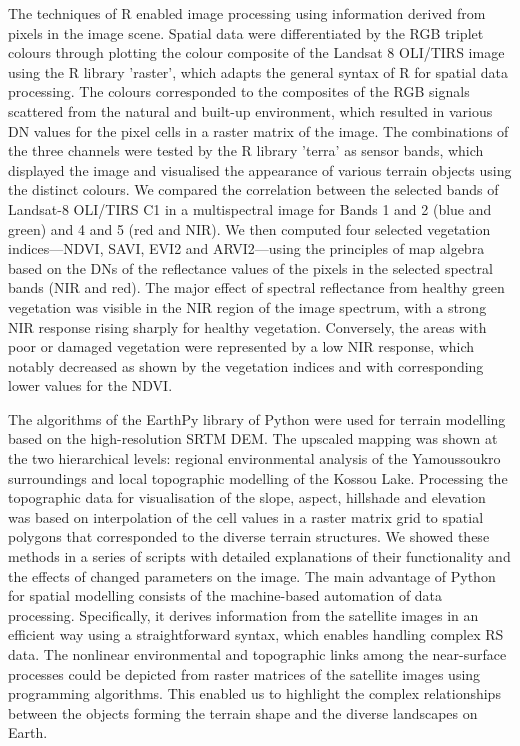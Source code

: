 \documentclass[jimaging,article,accept,pdftex,moreauthors]{Definitions/mdpi}
\begin{document}
The techniques of R {enabled} image processing{ }using information derived from pixels in the image scene. {Spatial data} were differentiated by the RGB triplet colours through plotting the colour composite of the Landsat 8 OLI/TIRS image using the R library 'raster', which {adapts} the general syntax of R for spatial data processing. The colours corresponded to the composites of the RGB signals scattered from the natural and built-up environment, which resulted in various DN values for the pixel cells in a raster matrix {of the image}. The combinations of the three channels were tested by the R library 'terra' as sensor bands, which {displayed} the image and {visualised} the appearance of various {terrain }objects{ }using the distinct colours. We compared the correlation between the selected bands of Landsat-8 OLI/TIRS C1 in a multispectral image for {Bands} 1 and 2 (blue and green) and 4 and 5 (red and NIR). We then computed four selected vegetation indices---NDVI, SAVI, EVI2 and ARVI2---using the principles of map algebra based on the DNs of the reflectance values of the pixels in the selected spectral bands (NIR and red). The major effect of spectral reflectance from healthy green vegetation was visible in the NIR region of the image spectrum, with a strong NIR response rising sharply for healthy vegetation. Conversely, the areas with poor or damaged vegetation were represented by a low NIR response, which notably decreased as shown by the vegetation indices and {with corresponding lower values for the NDVI}. 

{The algorithms of the EarthPy library of Python were used for terrain modelling based on the} high-resolution SRTM DEM. The upscaled mapping was shown at the two hierarchical levels: regional environmental analysis of the Yamoussoukro surroundings and local topographic modelling of the Kossou Lake. Processing the topographic data for{ }visualisation of the slope, aspect, hillshade and elevation {was based on} interpolation of the cell values {in a raster matrix grid} to spatial polygons{ that corresponded to the diverse terrain structures}. We {showed} these methods {in} a series of scripts with detailed explanations of their functionality and the effects{ of changed} parameters on the image. The main advantage of{ }Python for spatial modelling {consists of the machine-based automation of data processing. Specifically, it derives} information from the satellite images in an efficient way {using} a straightforward syntax, {which enables} handling complex {RS data}. {The }nonlinear environmental and topographic links among the near-surface processes {could be depicted from raster matrices of the satellite images} using programming algorithms. {This enabled us to highlight }the complex relationships between the objects forming the terrain shape and the diverse landscapes on Earth. 
\end{document}
